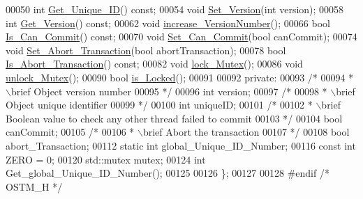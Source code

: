 \begin{DoxyCode}
00050     \textcolor{keywordtype}{int} \hyperlink{class_o_s_t_m_a5a01a8b98d16b1d1904ecf9356e7b71d}{Get\_Unique\_ID}() \textcolor{keyword}{const};
00054     \textcolor{keywordtype}{void} \hyperlink{class_o_s_t_m_a9529ad8d6d28c1f0cc9b86ed91df1ae1}{Set\_Version}(\textcolor{keywordtype}{int} version);
00058     \textcolor{keywordtype}{int} \hyperlink{class_o_s_t_m_a1f1db9d482f22c8e7caa17dfb340626b}{Get\_Version}() \textcolor{keyword}{const};
00062     \textcolor{keywordtype}{void} \hyperlink{class_o_s_t_m_a5f90caa4384d371c16b7cac860d9f89a}{increase\_VersionNumber}();
00066     \textcolor{keywordtype}{bool} \hyperlink{class_o_s_t_m_a8df39ced3b401aa466df97e26d14b1b7}{Is\_Can\_Commit}() \textcolor{keyword}{const};
00070     \textcolor{keywordtype}{void} \hyperlink{class_o_s_t_m_a813ee61c9d1c83c6a6ae30d12aca8a5d}{Set\_Can\_Commit}(\textcolor{keywordtype}{bool} canCommit);
00074     \textcolor{keywordtype}{void} \hyperlink{class_o_s_t_m_aba384cf65c5f56f5b86833730c3c6ea4}{Set\_Abort\_Transaction}(\textcolor{keywordtype}{bool} abortTransaction);
00078     \textcolor{keywordtype}{bool} \hyperlink{class_o_s_t_m_afc2851abf5342c3c67342c2c14820115}{Is\_Abort\_Transaction}() \textcolor{keyword}{const};
00082     \textcolor{keywordtype}{void} \hyperlink{class_o_s_t_m_af192c598a3c647f37aaba5757e60240f}{lock\_Mutex}();
00086     \textcolor{keywordtype}{void} \hyperlink{class_o_s_t_m_a6cd703bc26c719fd95b4f5362d050762}{unlock\_Mutex}();
00090     \textcolor{keywordtype}{bool} \hyperlink{class_o_s_t_m_afb6520023ed2c4a6188b688c46f192d0}{is\_Locked}();
00091 
00092 \textcolor{keyword}{private}:
00093     \textcolor{comment}{/*}
00094 \textcolor{comment}{     * \(\backslash\)brief Object version number}
00095 \textcolor{comment}{     */}
00096     \textcolor{keywordtype}{int} version;
00097     \textcolor{comment}{/*}
00098 \textcolor{comment}{     * \(\backslash\)brief Object unique identifier}
00099 \textcolor{comment}{     */}
00100     \textcolor{keywordtype}{int} uniqueID;
00101     \textcolor{comment}{/*}
00102 \textcolor{comment}{     * \(\backslash\)brief Boolean value to check any other thread failed to commit}
00103 \textcolor{comment}{     */}
00104     \textcolor{keywordtype}{bool} canCommit;
00105     \textcolor{comment}{/*}
00106 \textcolor{comment}{     * \(\backslash\)brief Abort the transaction}
00107 \textcolor{comment}{     */}
00108     \textcolor{keywordtype}{bool} abort\_Transaction;
00112     \textcolor{keyword}{static} \textcolor{keywordtype}{int} global\_Unique\_ID\_Number;
00116     \textcolor{keyword}{const} \textcolor{keywordtype}{int} ZERO = 0;
00120     std::mutex mutex;
00124     \textcolor{keywordtype}{int} Get\_global\_Unique\_ID\_Number();
00125 
00126 \};
00127 
00128 \textcolor{preprocessor}{#endif }\textcolor{comment}{/* OSTM\_H */}\textcolor{preprocessor}{}
\end{DoxyCode}

